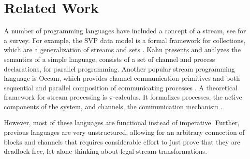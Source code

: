 \section{Related Work}
\label{sec:related}
A number of programming languages have included a concept of a stream,
see \cite{survey97} for a survey.  
For example, the SVP data model is a formal framework for collections,
which are a generalization of streams and sets \cite{Par92}.  Kahn
presents and analyzes the semantics of a simple language, consists of
a set of channel and process declarations, for parallel
programming\cite{Kah74}.  Another popular stream programming language
is Occam, which provides channel communication primitives and both
sequential and parallel composition of communicating processes
\cite{Jif93}.  A theoretical framework for stream processing is
$\pi$-calculus.  It formalizes processes, the active components of the
system, and channels, the communication mechanism
\cite{Pie97}. 

However, most of these languages are functional instead of imperative.
Further, previous languages are very unstructured, allowing for an
arbitrary connection of blocks and channels that requires considerable
effort to just prove that they are deadlock-free, let alone thinking
about legal stream transformations.

